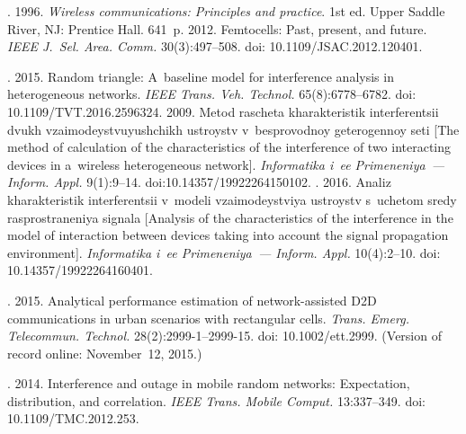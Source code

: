   \begin{multicols}{2}

\renewcommand{\bibname}{\protect\rmfamily References}

{\small\frenchspacing
 {%
 \begin{thebibliography}{99}
. 1996. 
\textit{Wireless communications: Principles and 
practice}. 1st ed. Upper Saddle River, NJ: Prentice Hall. 641~p.
 2012. Femtocells: 
Past, present, and future. \textit{IEEE J.~Sel. Area. Comm.} 30(3):497--508. 
doi: 10.1109/JSAC.2012.120401.

. 2015. 
Random triangle: A~baseline model for interference analysis in heterogeneous networks. 
\textit{IEEE Trans. Veh. Technol.} 65(8):6778--6782. doi: 
10.1109/TVT.2016.2596324.
 2009. Metod rascheta kharakteristik 
interferentsii dvukh vzaimo\-dey\-st\-vu\-yushchikh ustroystv v~besprovodnoy geterogennoy seti [The 
method of calculation of the characteristics of the interference of two interacting devices in 
a~wireless heterogeneous network]. \textit{Informatika i~ee Primeneniya~--- Inform. Appl.}  
9(1):9--14. doi:10.14357/19922264150102.
. 
2016. Analiz kharakteristik interferentsii v~modeli vzaimodeystviya ustroystv s~uchetom sredy 
rasprostraneniya signala [Analysis of the characteristics of the interference in the model of 
interaction between devices taking into account the signal propagation environment]. 
\textit{Informatika i~ee Primeneniya~--- Inform. Appl.} 10(4):2--10. doi: 
10.14357/19922264160401.

. 2015. Analytical 
performance estimation of network-assisted D2D communications in urban scenarios with 
rectangular cells. \textit{Trans. Emerg. Telecommun. Technol.} 28(2):2999-1--2999-15. 
doi: 10.1002/ett.2999.  (Version of record 
online: November~12,  2015.)

. 2014. Interference and outage in mobile random networks: 
Expectation, distribution, and correlation. \textit{IEEE Trans. Mobile Comput.}  
13:337--349. doi: 10.1109/TMC.2012.253.


\end{thebibliography}}}
\end{multicols}
